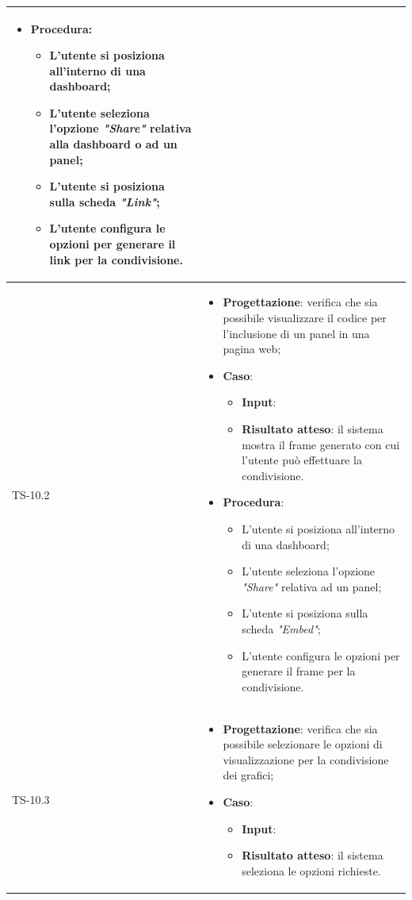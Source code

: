\begin{longtable}{|C{2.5cm}|C{13cm}|}
\begin{itemize}
\begin{itemize}
	\end{itemize}
	\item \textbf{Procedura}:
	\begin{itemize}
		\item L'utente si posiziona all'interno di una dashboard;
		\item L'utente seleziona l'opzione \emph{"Share"} relativa alla dashboard o ad un panel;
		\item L'utente si posiziona sulla scheda \emph{"Link"};
		\item L'utente configura le opzioni per generare il link per la condivisione.
	\end{itemize} 
\end{itemize}
	 \\
	\hline
	{TS-10.2} &
\begin{itemize}
	\item \textbf{Progettazione}: verifica che sia  possibile visualizzare il
	codice per l’inclusione di un panel in una pagina web;
	\item \textbf{Caso}: 
	\begin{itemize}
		\item \textbf{Input}: 
		\item \textbf{Risultato atteso}: il sistema mostra il frame generato con cui l'utente può effettuare la condivisione.
	\end{itemize}
	\item \textbf{Procedura}:
	\begin{itemize}
		\item L'utente si posiziona all'interno di una dashboard;
		\item L'utente seleziona l'opzione \emph{"Share"} relativa ad un panel;
		\item L'utente si posiziona sulla scheda \emph{"Embed"};
		\item L'utente configura le opzioni per generare il frame per la condivisione.
	\end{itemize} 
\end{itemize}
	  \\
	\hline
	{TS-10.3} &
\begin{itemize}
	\item \textbf{Progettazione}: verifica che sia possibile selezionare le
	opzioni di visualizzazione per la condivisione dei grafici;
	\item \textbf{Caso}: 
	\begin{itemize}
		\item \textbf{Input}: 
		\item \textbf{Risultato atteso}: il sistema seleziona le opzioni richieste.

\end{itemize}
\end{itemize}
\end{longtable}
